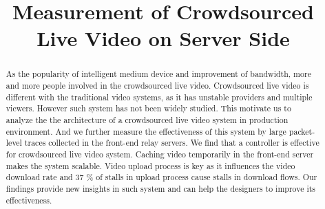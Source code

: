 \documentclass{article}
\begin{document}
\title{Measurement of Crowdsourced Live Video on Server Side}

\date{}
\maketitle

\begin{abstract}
As the popularity of intelligent medium device and improvement of bandwidth, more and more people involved in the crowdsourced live video. Crowdsourced live video is different with the traditional video systems, as it has unstable providers and multiple viewers. However such system has not been widely studied.  This motivate us to analyze the the architecture of a crowdsourced live video system in production environment.  And we further measure the effectiveness of this system by large packet-level traces collected in the front-end relay servers. We find that a controller is effective for crowdsourced live video system.  Caching video temporarily in the front-end server  makes the system scalable. Video upload process is key as it influences the video download rate and 37 \% of stalls in upload process cause stalls in download flows. Our findings provide new insights in such system and can help the designers to improve its effectiveness.
\end{abstract}







%





\end{document}

